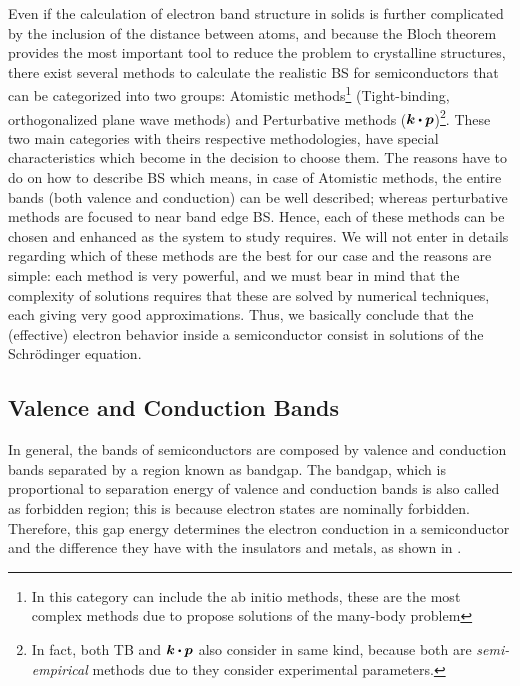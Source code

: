 Even if the calculation of electron band structure in solids is further complicated by the inclusion of the distance between atoms, and because the Bloch theorem provides the most important tool to reduce the problem to crystalline structures, there exist several methods to calculate the realistic \gls{BS} for semiconductors that can be categorized into two groups: Atomistic methods\footnote{In this category can include the ab initio methods, these are the most complex methods due to propose  solutions of the many-body problem} (Tight-binding, orthogonalized plane wave methods) and Perturbative methods ($\boldsymbol{k}\bigcdot \boldsymbol{p}$)\footnote{In fact, both TB and $\boldsymbol{k}\bigcdot \boldsymbol{p}$ also consider in same kind, because both are \emph{semi-empirical} methods due to they consider experimental parameters.}. 
These two main categories with theirs respective methodologies, have special characteristics which become in the decision to choose them. The reasons have to do on how to describe \gls{BS} which means, in case of Atomistic methods, the entire bands  (both valence and conduction) can be well described; whereas  perturbative methods are focused to near band edge \gls{BS}. Hence, each of these methods can be chosen and enhanced as the system to study requires. 
We will not enter in details regarding  which of these methods are the best for our case and the reasons are simple: each method is very powerful, and we must bear in mind that the complexity of solutions requires that these are solved by numerical techniques, each giving very good approximations. 
Thus, we basically conclude that the (effective) electron behavior inside a semiconductor consist in solutions of the Schrödinger equation\cite{boer2018semiconductor}.  
\subsection{Valence and Conduction Bands}
\label{subsec:chapter-1-valence-and-conduction-bands}
\vspace{-10mm}
In general,  the bands of semiconductors are composed by valence and conduction bands separated by a  region known as bandgap. 
The bandgap, which is proportional to separation energy of valence and conduction bands is also called as forbidden region; this is because electron states are nominally forbidden. Therefore, this gap energy determines the electron conduction in a semiconductor and the difference they have with the insulators and metals, as shown in .  

